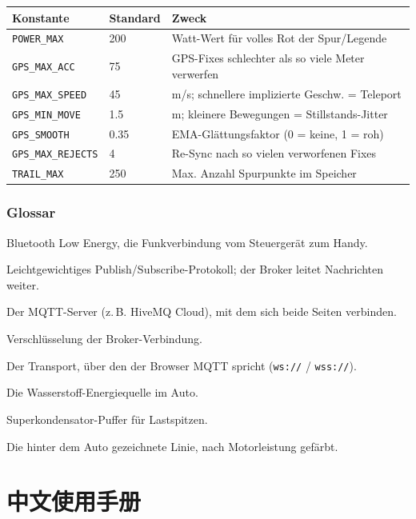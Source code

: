 \documentclass[11pt,a4paper,oneside]{report}
\newcommand{\code}[1]{\texttt{#1}}
\newcommand{\guidepart}[1]{%
  \clearpage
  \part*{#1}%
  \addcontentsline{toc}{part}{#1}%
  \setcounter{section}{0}%
}
\begin{document}
\begin{tabularx}{\linewidth}{@{}llL@{}}
\toprule
\textbf{Konstante} & \textbf{Standard} & \textbf{Zweck}\\
\midrule
\code{POWER\_MAX} & 200 & Watt-Wert f\"ur volles Rot der Spur/Legende\\
\code{GPS\_MAX\_ACC} & 75 & GPS-Fixes schlechter als so viele Meter verwerfen\\
\code{GPS\_MAX\_SPEED} & 45 & m/s; schnellere implizierte Geschw. = Teleport\\
\code{GPS\_MIN\_MOVE} & 1.5 & m; kleinere Bewegungen = Stillstands-Jitter\\
\code{GPS\_SMOOTH} & 0.35 & EMA-Gl\"attungsfaktor (0 = keine, 1 = roh)\\
\code{GPS\_MAX\_REJECTS} & 4 & Re-Sync nach so vielen verworfenen Fixes\\
\code{TRAIL\_MAX} & 250 & Max. Anzahl Spurpunkte im Speicher\\
\bottomrule
\end{tabularx}

\section{Glossar}
\begin{description}[style=nextline,leftmargin=0pt,labelwidth=0pt,labelsep=0pt,itemindent=0pt]
  \item[BLE] Bluetooth Low Energy, die Funkverbindung vom Steuerger\"at zum Handy.
  \item[MQTT] Leichtgewichtiges Publish/Subscribe-Protokoll; der Broker leitet Nachrichten weiter.
  \item[Broker] Der MQTT-Server (z.\,B. HiveMQ Cloud), mit dem sich beide Seiten verbinden.
  \item[TLS] Verschl\"usselung der Broker-Verbindung.
  \item[WebSocket] Der Transport, \"uber den der Browser MQTT spricht (\code{ws://} / \code{wss://}).
  \item[Brennstoffzelle (BZ)] Die Wasserstoff-Energiequelle im Auto.
  \item[Supercap] Superkondensator-Puffer f\"ur Lastspitzen.
  \item[Spur (Trail)] Die hinter dem Auto gezeichnete Linie, nach Motorleistung gef\"arbt.
\end{description}


\guidepart{中文使用手册}
\end{document}
